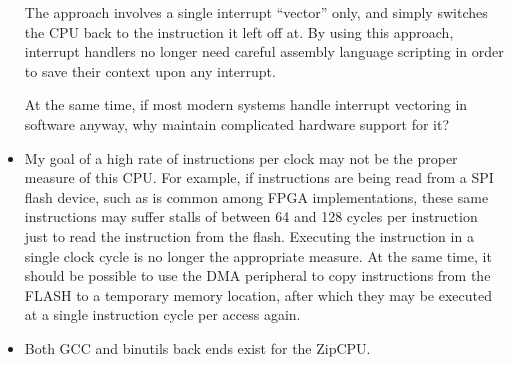 \documentclass{gqtekspec}
\begin{document}
\begin{itemize}
	The approach involves a single interrupt ``vector'' only, and simply
	switches the CPU back to the instruction it left off at.  By using
	this approach, interrupt handlers no longer need careful assembly
	language scripting in order to save their context upon any interrupt.

	At the same time, if most modern systems handle interrupt vectoring in
	software anyway, why maintain complicated hardware support for it?

\item My goal of a high rate of instructions per clock may not be the proper
	measure of this CPU. For example, if instructions are being read from a
	SPI flash device, such as is common among FPGA implementations, these
	same instructions may suffer stalls of between 64 and 128 cycles per
	instruction just to read the instruction from the flash. Executing the
	instruction in a single clock cycle is no longer the appropriate
	measure. At the same time, it should be possible to use the DMA
	peripheral to copy instructions from the FLASH to a temporary memory
	location, after which they may be executed at a single instruction
	cycle per access again. 

\item Both GCC and binutils back ends exist for the ZipCPU.
\end{itemize}
\end{document}
